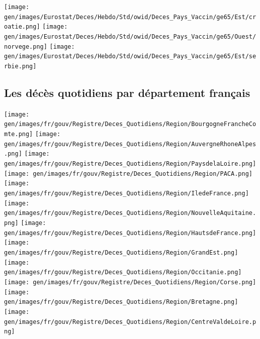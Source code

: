\documentclass[
]{article}
\begin{document}
\texttt{[image: gen/images/Eurostat/Deces/Hebdo/Std/owid/Deces\_Pays\_Vaccin/ge65/Est/croatie.png]}
\texttt{[image: gen/images/Eurostat/Deces/Hebdo/Std/owid/Deces\_Pays\_Vaccin/ge65/Ouest/norvege.png]}
\texttt{[image: gen/images/Eurostat/Deces/Hebdo/Std/owid/Deces\_Pays\_Vaccin/ge65/Est/serbie.png]}

\hypertarget{les-duxe9cuxe8s-quotidiens-par-duxe9partement-franuxe7ais}{%
\subsection{Les décès quotidiens par département
français}\label{les-duxe9cuxe8s-quotidiens-par-duxe9partement-franuxe7ais}}

\texttt{[image: gen/images/fr/gouv/Registre/Deces\_Quotidiens/Region/BourgogneFrancheComte.png]}
\texttt{[image: gen/images/fr/gouv/Registre/Deces\_Quotidiens/Region/AuvergneRhoneAlpes.png]}
\texttt{[image: gen/images/fr/gouv/Registre/Deces\_Quotidiens/Region/PaysdelaLoire.png]}
\texttt{[image: gen/images/fr/gouv/Registre/Deces\_Quotidiens/Region/PACA.png]}
\texttt{[image: gen/images/fr/gouv/Registre/Deces\_Quotidiens/Region/IledeFrance.png]}
\texttt{[image: gen/images/fr/gouv/Registre/Deces\_Quotidiens/Region/NouvelleAquitaine.png]}
\texttt{[image: gen/images/fr/gouv/Registre/Deces\_Quotidiens/Region/HautsdeFrance.png]}
\texttt{[image: gen/images/fr/gouv/Registre/Deces\_Quotidiens/Region/GrandEst.png]}
\texttt{[image: gen/images/fr/gouv/Registre/Deces\_Quotidiens/Region/Occitanie.png]}
\texttt{[image: gen/images/fr/gouv/Registre/Deces\_Quotidiens/Region/Corse.png]}
\texttt{[image: gen/images/fr/gouv/Registre/Deces\_Quotidiens/Region/Bretagne.png]}
\texttt{[image: gen/images/fr/gouv/Registre/Deces\_Quotidiens/Region/CentreValdeLoire.png]}
\end{document}
